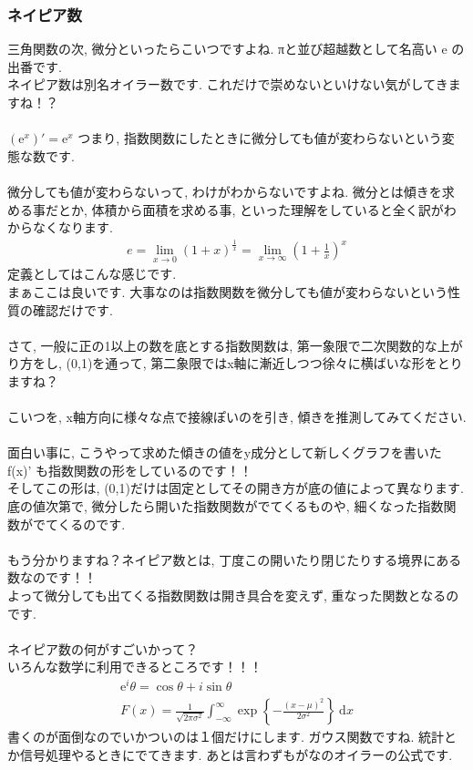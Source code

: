 \documentclass[11pt,a4paper]{jsarticle}
\begin{document}
\subsubsection{ネイピア数}
三角関数の次, 微分といったらこいつですよね. πと並び超越数として名高い e の出番です.\\
ネイピア数は別名オイラー数です. これだけで崇めないといけない気がしてきますね！？\\
\\
$(\mathrm{e}^x)' = \mathrm{e}^x$ つまり, 指数関数にしたときに微分しても値が変わらないという変態な数です.\\
\\
微分しても値が変わらないって, わけがわからないですよね. 微分とは傾きを求める事だとか, 体積から面積を求める事, といった理解をしていると全く訳がわからなくなります.\\
\begin{eqnarray}
e = \lim_{x\to 0} (1+x)^\frac{1}{x} = \lim_{x \to \infty} (1+\frac{1}{x})^x
\end{eqnarray}
定義としてはこんな感じです.\\
まぁここは良いです. 大事なのは指数関数を微分しても値が変わらないという性質の確認だけです.\\
\\
さて, 一般に正の1以上の数を底とする指数関数は, 第一象限で二次関数的な上がり方をし, (0,1)を通って, 第二象限ではx軸に漸近しつつ徐々に横ばいな形をとりますね？\\
\\
こいつを, x軸方向に様々な点で接線ぽいのを引き, 傾きを推測してみてください. \\
\\
面白い事に, こうやって求めた傾きの値をy成分として新しくグラフを書いた f(x)' も指数関数の形をしているのです！！\\
そしてこの形は, (0,1)だけは固定としてその開き方が底の値によって異なります. \\
底の値次第で, 微分したら開いた指数関数がでてくるものや, 細くなった指数関数がでてくるのです.\\
\\
もう分かりますね？ネイピア数とは, 丁度この開いたり閉じたりする境界にある数なのです！！\\
よって微分しても出てくる指数関数は開き具合を変えず, 重なった関数となるのです.\\
\\
ネイピア数の何がすごいかって？\\
いろんな数学に利用できるところです！！！\\
\begin{eqnarray}
\mathrm{e}^i\theta = \cos\theta + i\sin\theta \\
F(x)=\frac{1}{\sqrt{2\pi \sigma^2}}\int_{-\infty}^{\infty}\exp{\left\{-\frac{(x-\mu)^2}{2\sigma^2}\right\}}\ \mathrm{d}x
\end{eqnarray}
書くのが面倒なのでいかついのは１個だけにします. ガウス関数ですね. 統計とか信号処理やるときにでてきます. あとは言わずもがなのオイラーの公式です.\\
\end{document}
